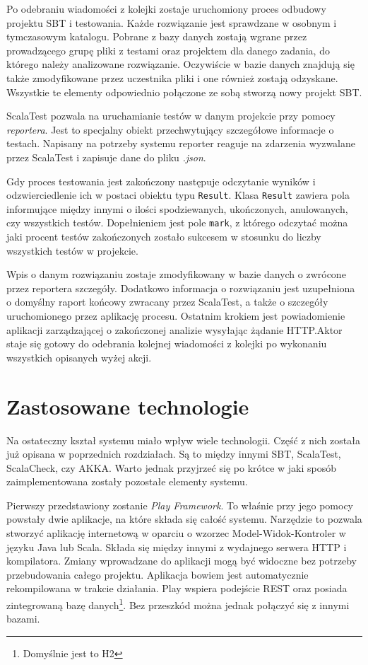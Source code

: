 \documentclass[brudnopis]{xmgr}
\begin{document}
Po odebraniu wiadomości z kolejki zostaje uruchomiony proces odbudowy projektu SBT i testowania. Każde rozwiązanie jest sprawdzane w osobnym i tymczasowym katalogu. Pobrane z bazy danych zostają wgrane przez prowadzącego grupę pliki z testami oraz projektem dla danego zadania, do którego należy analizowane rozwiązanie. Oczywiście w bazie danych znajdują się także zmodyfikowane przez uczestnika pliki i one również zostają odzyskane. Wszystkie te elementy odpowiednio połączone ze sobą stworzą nowy projekt SBT. 

ScalaTest pozwala na uruchamianie testów w danym projekcie przy pomocy \emph{reportera}. Jest to specjalny obiekt przechwytujący szczegółowe informacje o testach. Napisany na potrzeby systemu reporter reaguje na zdarzenia wyzwalane przez ScalaTest i zapisuje dane do pliku \emph{.json}. 

Gdy proces testowania jest zakończony następuje odczytanie wyników i odzwierciedlenie ich w postaci obiektu typu \texttt{Result}. Klasa \texttt{Result} zawiera pola informujące między innymi o ilości spodziewanych, ukończonych, anulowanych, czy wszystkich testów. Dopełnieniem jest pole \texttt{mark}, z którego odczytać można jaki procent testów zakończonych zostało sukcesem w stosunku do liczby wszystkich testów w projekcie. 

Wpis o danym rozwiązaniu zostaje zmodyfikowany w bazie danych o zwrócone przez reportera szczegóły. Dodatkowo informacja o rozwiązaniu jest uzupełniona o domyślny raport końcowy zwracany przez ScalaTest, a także o szczegóły uruchomionego przez aplikację procesu. Ostatnim krokiem jest powiadomienie aplikacji zarządzającej o zakończonej analizie wysyłając żądanie HTTP.Aktor staje się gotowy do odebrania kolejnej wiadomości z kolejki po wykonaniu wszystkich opisanych wyżej akcji.

\section{Zastosowane technologie}

Na ostateczny kształ systemu miało wpływ wiele technologii. Część z nich została już opisana w poprzednich rozdziałach. Są to między innymi SBT, ScalaTest, ScalaCheck, czy AKKA. Warto jednak przyjrzeć się po krótce w jaki sposób zaimplementowana zostały pozostałe elementy systemu. 

Pierwszy przedstawiony zostanie \emph{Play Framework}. To właśnie przy jego pomocy powstały dwie aplikacje, na które składa się całość systemu. Narzędzie to pozwala stworzyć aplikację internetową w oparciu o wzorzec Model-Widok-Kontroler w języku Java lub Scala. Składa się między innymi z wydajnego serwera HTTP i kompilatora. Zmiany wprowadzane do aplikacji mogą być widoczne bez potrzeby przebudowania całego projektu. Aplikacja bowiem jest automatycznie rekompilowana w trakcie działania. Play wspiera podejście REST oraz posiada zintegrowaną bazę danych\footnote{Domyślnie jest to H2}. Bez przeszkód można jednak połączyć się z innymi bazami. 
\end{document}
